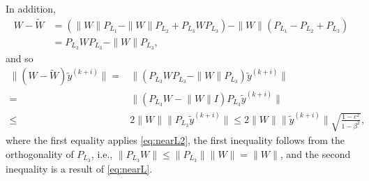 \documentclass[11pt]{article}
\begin{document}
{{In addition,
\begin{align}\label{eq:nearL2}
W-\widetilde{W}&=(\|W\|P_{L_1}-\|W\|P_{L_2}+P_{L_3}WP_{L_3})-\|W\|(P_{L_1}-P_{L_2}+P_{L_3}) \\
&=P_{L_3}WP_{L_3}-\|W\|P_{L_3}, \nonumber 
\end{align}
and so
\begin{align*}
\| (W-\widetilde{W})\widetilde{y}^{(k+i)}\| 
=&\|(P_{L_3}WP_{L_3}-\|W\|P_{L_3})\widetilde{y}^{(k+i)}\| \nonumber \\
=&\|(P_{L_3}W\!-\!\|W\|I)P_{L_3}\widetilde{y}^{(k+i)}\|\\\leq& 2\|W\|\|P_{L_3}\widetilde{y}^{(k+i)}\| \nonumber 
\leq2\|W\|\|\widetilde{y}^{(k+i)}\|\sqrt{\frac{1-c^2}{1-\beta^2}},
\end{align*}
where the first equality applies \eqref{eq:nearL2}, the first inequality follows from the orthogonality of $P_{L_3}$, i.e., $\|P_{L_3}W\|\leq \|P_{L_3}\|\|W\|=\|W\|$, and the second inequality is a result of \eqref{eq:nearL}. %



{
}}}
\end{document}
